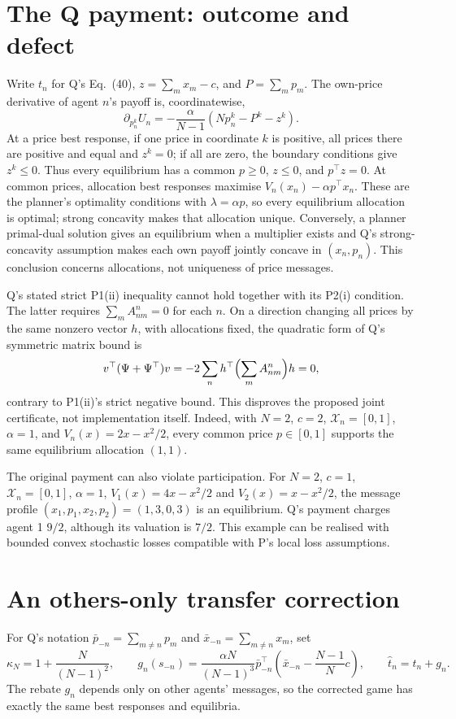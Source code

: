 \documentclass{article}
\begin{document}
\section{The Q payment: outcome and defect}
Write \(t_n\) for Q's Eq.~(40), \(z=\sum_mx_m-c\), and \(P=\sum_mp_m\). The own-price derivative of agent \(n\)'s payoff is, coordinatewise,
\[
\partial_{p_n^k}U_n=-\frac{\alpha}{N-1}(Np_n^k-P^k-z^k).
\]
At a price best response, if one price in coordinate \(k\) is positive, all prices there are positive and equal and \(z^k=0\); if all are zero, the boundary conditions give \(z^k\leq0\). Thus every equilibrium has a common \(p\geq0\), \(z\leq0\), and \(p^\top z=0\). At common prices, allocation best responses maximise \(V_n(x_n)-\alpha p^\top x_n\). These are the planner's optimality conditions with \(\lambda=\alpha p\), so every equilibrium allocation is optimal; strong concavity makes that allocation unique. Conversely, a planner primal-dual solution gives an equilibrium when a multiplier exists and Q's strong-concavity assumption makes each own payoff jointly concave in \((x_n,p_n)\). This conclusion concerns allocations, not uniqueness of price messages. %

Q's stated strict P1(ii) inequality cannot hold together with its P2(i) condition. The latter requires \(\sum_mA_{nm}^n=0\) for each \(n\). On a direction changing all prices by the same nonzero vector \(h\), with allocations fixed, the quadratic form of Q's symmetric matrix bound is
\[
v^\top(\Psi+\Psi^\top)v
=-2\sum_nh^\top\Bigl(\sum_m A_{nm}^n\Bigr)h=0,
\]
contrary to P1(ii)'s strict negative bound. This disproves the proposed joint certificate, not implementation itself. Indeed, with \(N=2\), \(c=2\), \(\mathcal X_n=[0,1]\), \(\alpha=1\), and \(V_n(x)=2x-x^2/2\), every common price \(p\in[0,1]\) supports the same equilibrium allocation \((1,1)\). %

The original payment can also violate participation. For \(N=2\), \(c=1\), \(\mathcal X_n=[0,1]\), \(\alpha=1\), \(V_1(x)=4x-x^2/2\) and \(V_2(x)=x-x^2/2\), the message profile \((x_1,p_1,x_2,p_2)=(1,3,0,3)\) is an equilibrium. Q's payment charges agent 1 \(9/2\), although its valuation is \(7/2\). This example can be realised with bounded convex stochastic losses compatible with P's local loss assumptions. %

\section{An others-only transfer correction}
For Q's notation \(\bar p_{-n}=\sum_{m\ne n}p_m\) and \(\bar x_{-n}=\sum_{m\ne n}x_m\), set
\[
\kappa_N=1+\frac{N}{(N-1)^2},\qquad
g_n(s_{-n})=\frac{\alpha N}{(N-1)^3}\bar p_{-n}^{\top}
\left(\bar x_{-n}-\frac{N-1}{N}c\right),
\qquad \widehat t_n=t_n+g_n.
\]
The rebate \(g_n\) depends only on other agents' messages, so the corrected game has exactly the same best responses and equilibria. %
\end{document}
